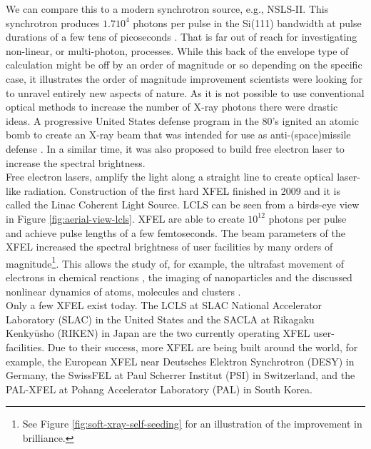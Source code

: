 We can compare this to a modern synchrotron source, e.g., NSLS-II. This synchrotron produces $1.7 10^{4}$ photons per pulse in the Si(111) bandwidth at pulse durations of a few tens of picoseconds \cite{Williams-2016-PC}. That is far out of reach for investigating non-linear, or multi-photon, processes. While this back of the envelope type of calculation might be off by an order of magnitude or so depending on the specific case, it illustrates the order of magnitude improvement scientists were looking for to unravel entirely new aspects of nature. As it is not possible to use conventional optical methods to increase the number of X-ray photons there were drastic ideas. A progressive United States defense program in the 80's ignited an atomic bomb to create an X-ray beam that was intended for use as anti-(space)missile defense \cite{Hecht-2008-OPN}. In a similar time, it was also proposed to build free electron laser \cite{Kondratenko-1980-PA,Bonifacio-1984-OC} to increase the spectral brightness.\\[1\baselineskip]
%
Free electron lasers, amplify the light along a straight line to create optical laser-like radiation. Construction of the first hard XFEL finished in 2009 and it is called the Linac Coherent Light Source. LCLS can be seen from a birds-eye view in Figure \ref{fig:aerial-view-lcls}. XFEL are able to create $10^{12}$ photons per pulse and achieve pulse lengths of a few femtoseconds. The beam parameters of the XFEL increased the spectral brightness of user facilities by many orders of magnitude\footnote{See Figure \ref{fig:soft-xray-self-seeding} for an illustration of the improvement in brilliance.}. This allows the study of, for example, the ultrafast movement of electrons in chemical reactions \citep{Dell'Angela-2013-Science,Picon-2016-NatComm}, the imaging of nanoparticles \citep{Chapman-2011-Nature,Seibert-2011-Nature} and the discussed nonlinear dynamics of atoms, molecules and clusters \citep{Young-2010-Nature,Rohringer-2012-Nature,Berrah-2011-PNAS,Gorkhover-2012-PRL}.\\[1\baselineskip]
%
Only a few XFEL exist today. The LCLS at SLAC National Accelerator Laboratory (SLAC) in the United States and the SACLA at Rikagaku Kenkyūsho (RIKEN) in Japan are the two currently operating XFEL user-facilities. Due to their success, more XFEL are being built around the world, for example, the European XFEL near Deutsches Elektron Synchrotron (DESY) in Germany, the SwissFEL at Paul Scherrer Institut (PSI) in Switzerland, and the PAL-XFEL at Pohang Accelerator Laboratory (PAL) in South Korea.
%
%
%
